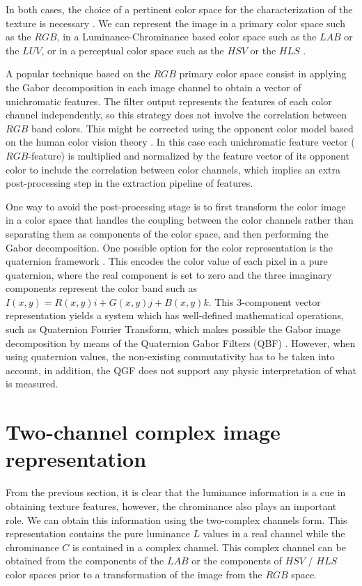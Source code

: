 In both cases, the choice of a pertinent color space for the characterization of the texture is necessary \cite{Qazi.Alata.ea:PR:2011}. We can represent the image in a primary color space such as the $RGB$, in a Luminance-Chrominance based color space such as the $LAB$ or the $LUV$, or in a perceptual color space such as the $HSV$ or the $HLS$ \cite{Hanbury:IA:2003}. 

A popular technique based on the $RGB$ primary color space consist in applying the Gabor decomposition in each image channel to obtain a vector of unichromatic features. The filter output represents the features of each color channel independently, so this strategy does not involve the correlation between $RGB$ band colors. This might be corrected using the opponent color model based on the human color vision theory \cite{Jain.Healey:TIP:1998}. In this case each unichromatic feature vector ($RGB$-feature) is multiplied and normalized by the feature vector of its opponent color to include the correlation between color channels, which implies an extra post-processing step in the extraction pipeline of features.

One way to avoid the post-processing stage is to first transform the color image in a color space that handles the coupling between the color channels rather than separating them as components of the color space, and then performing the Gabor decomposition. One possible option for the color representation is the quaternion framework \cite{Sangwine.Ell:VISP:2000}. This encodes the color value of each pixel in a pure quaternion, where the real component is set to zero and the three imaginary components represent the color band such as $I(x, y) = R (x, y) i + G (x, y) j + B (x, y) k $. This 3-component vector representation yields a system which has well-defined mathematical operations, such as Quaternion Fourier Transform, which makes possible the Gabor image decomposition by means of the Quaternion Gabor Filters (QBF) \cite{Subakan.Vemuri:EMMCVPR:2009}. However, when using quaternion values, the non-existing commutativity has to be taken into account, in addition, the QGF does not support any physic interpretation of what is measured.

\section{Two-channel complex image representation}

From the previous section, it is clear that the luminance information is a cue in obtaining texture features, however, the chrominance also plays an important role. We can obtain this information using the two-complex channels form. This representation contains the pure luminance $L$ values in a real channel while the chrominance $C$ is contained in a complex channel. This complex channel can be obtained from the components of the $LAB$ or the components of $HSV$ / $HLS$ color spaces prior to a transformation of the image from the $RGB$ space.

